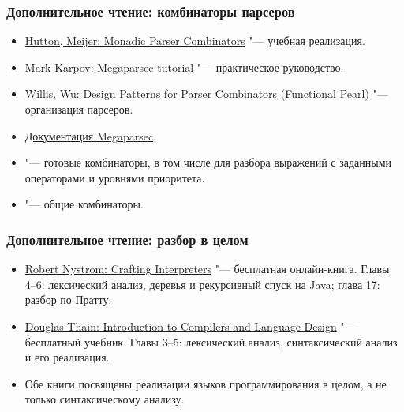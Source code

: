 \documentclass[11pt]{beamer}
\begin{document}
\begin{frame}[fragile]
  \frametitle{Дополнительное чтение: комбинаторы парсеров}
  \begin{itemize}
    \item \href{https://www.cs.nott.ac.uk/~pszgmh/monparsing.pdf}{Hutton, Meijer: Monadic Parser Combinators} "--- учебная реализация.
    \item \href{https://markkarpov.com/tutorial/megaparsec.html}{Mark Karpov: Megaparsec tutorial} "--- практическое руководство.
    \item \href{https://dl.acm.org/doi/10.1145/3471874.3472984}{Willis, Wu: Design Patterns for Parser Combinators (Functional Pearl)} "--- организация парсеров.
    \item \href{https://hackage.haskell.org/package/megaparsec/docs/Text-Megaparsec.html}{Документация Megaparsec}.
    \item {} "--- готовые комбинаторы, в том числе \href{https://hackage.haskell.org/package/parser-combinators/docs/Control-Monad-Combinators-Expr.html}{} для разбора выражений с заданными операторами и уровнями приоритета.
    \item \href{https://hackage.haskell.org/package/base/docs/Control-Applicative.html}{} "--- общие комбинаторы.
  \end{itemize}
\end{frame}
\begin{frame}[fragile]
  \frametitle{Дополнительное чтение: разбор в целом}
  \begin{itemize}
    \item \href{https://craftinginterpreters.com/contents.html}{Robert Nystrom: Crafting Interpreters} "--- бесплатная онлайн-книга. Главы 4--6: лексический анализ, деревья и рекурсивный спуск на Java; глава 17: разбор по Пратту.
    \item \href{https://dthain.github.io/books/compiler/}{Douglas Thain: Introduction to Compilers and Language Design} "--- бесплатный учебник. Главы 3--5: лексический анализ, синтаксический анализ и его реализация.
    \item Обе книги посвящены реализации языков программирования в целом, а не только синтаксическому анализу.
  \end{itemize}
\end{frame}
\end{document}
